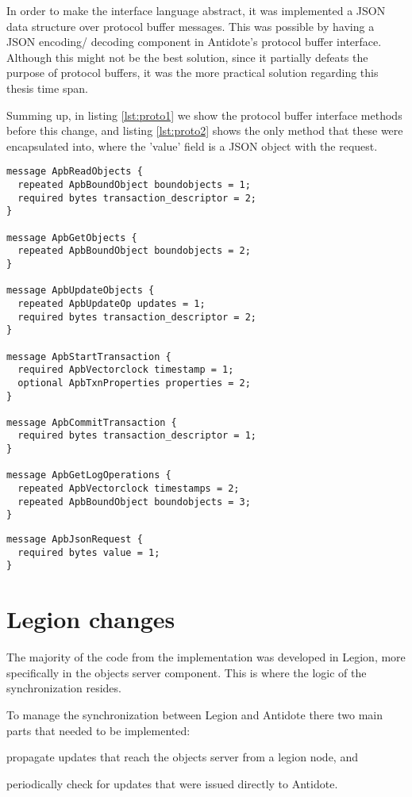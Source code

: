 	In order to make the interface language abstract, it was implemented a JSON data structure over protocol buffer messages. This was possible by having a JSON encoding/ decoding component in Antidote's protocol buffer interface. Although this might not be the best solution, since it partially defeats the purpose of protocol buffers, it was the more practical solution regarding this thesis time span.\par
	Summing up, in listing \ref{lst:proto1} we show the protocol buffer interface methods before this change, and listing \ref{lst:proto2} shows the only method that these were encapsulated into, where the 'value' field is a JSON object with the request.
\begin{lstlisting}[caption={Protocol Buffer interface methods before},label={lst:proto1}]
message ApbReadObjects {
  repeated ApbBoundObject boundobjects = 1;
  required bytes transaction_descriptor = 2;
}

message ApbGetObjects {
  repeated ApbBoundObject boundobjects = 2;
}

message ApbUpdateObjects {
  repeated ApbUpdateOp updates = 1;
  required bytes transaction_descriptor = 2;
}

message ApbStartTransaction {
  required ApbVectorclock timestamp = 1;
  optional ApbTxnProperties properties = 2;
}

message ApbCommitTransaction {
  required bytes transaction_descriptor = 1;
}

message ApbGetLogOperations {
  repeated ApbVectorclock timestamps = 2;
  repeated ApbBoundObject boundobjects = 3;
}
\end{lstlisting}

\begin{lstlisting}[caption={Protocol Buffer interface methods after},label={lst:proto2}]
message ApbJsonRequest {
  required bytes value = 1;
}
\end{lstlisting}

\section{Legion changes}
\label{sec:legion_changes}
The majority of the code from the implementation was developed in Legion, more specifically in the objects server component. This is where the logic of the synchronization resides.\par
	To manage the synchronization between Legion and Antidote there two main parts that needed to be implemented: 
\begin{enumerate*}[(i)]
\item propagate updates that reach the objects server from a legion node, and 
\item periodically check for updates that were issued directly to Antidote.
\end{enumerate*}

